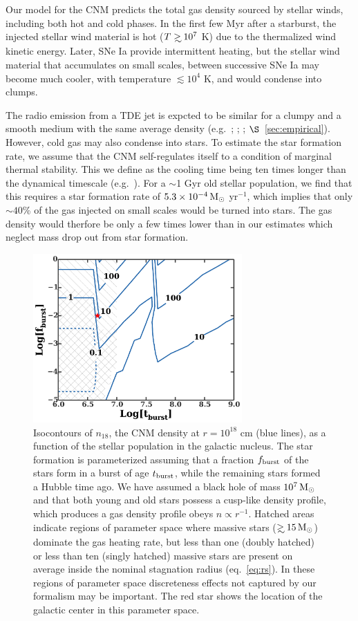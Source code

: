 \documentclass[usenatbib,fleqn]{mnras}
\newcommand\gsim{\mathrel{\rlap{\lower4pt\hbox{\hskip1pt$\sim$}}
    \raise1pt\hbox{$>$}}}
\newcommand{\Msun}{{\rm M_\odot}}
\begin{document}
Our model for the CNM predicts the total gas density
sourced by stellar winds, including both hot and cold phases.  In the
first few Myr after a starburst, the injected stellar wind material is hot ($T\gsim 10^{7}$ K) due to the
thermalized wind kinetic energy.  Later, SNe Ia provide intermittent heating, but the stellar wind material that accumulates on small
scales, between successive SNe Ia may become much cooler, with
temperature $\lesssim 10^{4}$ K, and would condense into clumps.

The radio emission from a TDE jet is expcted to be similar for a
clumpy and a smooth medium with the same average density
(e.g.~\citealt{Nakar&Granot2007}; \citealt{Mimica&Giannios2009};
\citealt{vanEerten+2009}; $\S$~\ref{sec:empirical}).  However, cold gas
may also condense into stars.  To estimate the star formation rate, we
assume that the CNM self-regulates itself to a condition of marginal
thermal stability.  This we define as the cooling time being ten times
longer than the dynamical timescale (e.g.~\citealt{McCourt+09}). For a
$\sim$1 Gyr old stellar population, we find that this requires a star
formation rate of $5.3 \times 10^{-4} \,\Msun$ yr$^{-1}$, which
implies that only $\sim 40$\% of the gas injected on small scales
would be turned into stars.  The gas density would therfore be only a
few times lower than in our estimates which neglect mass drop out from
star formation.

\begin{figure} 
  \includegraphics[width=8cm]{cnm_plot.pdf}
  \caption{\label{fig:param} Isocontours of $n_{18}$, the CNM density
    at $r = 10^{18}$ cm (blue lines), as a function of the stellar
    population in the galactic nucleus.  The star formation is
    parameterized assuming that a fraction $f_{\rm burst}$ of the
    stars form in a burst of age $t_{\rm burst}$, while the remaining
    stars formed a Hubble time ago.  We have assumed a black hole of
    mass $10^{7} \, \Msun$ and that both young and old stars possess a
    cusp-like density profile, which produces a gas density profile
    obeys $n \propto r^{-1}$.  Hatched areas indicate regions of
    parameter space where massive stars ($\gsim 15 \, \Msun$) dominate
    the gas heating rate, but less than one (doubly hatched) or less
    than ten (singly hatched) massive stars are present on average
    inside the nominal stagnation radius (eq.~\ref{eq:rs}).  In these
    regions of parameter space discreteness effects not captured by
    our formalism may be important. The red star shows the location of
    the galactic center in this parameter space.}
\end{figure}
\end{document}
